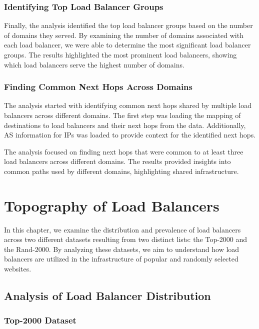 \documentclass[12pt]{cwru_thesis}
\begin{document}
\subsection{Identifying Top Load Balancer Groups}

Finally, the analysis identified the top load balancer groups based on the number of domains they served. By examining the number of domains associated with each load balancer, we were able to determine the most significant load balancer groups. The results highlighted the most prominent load balancers, showing which load balancers serve the highest number of domains.

\subsection{Finding Common Next Hops Across Domains}

The analysis started with identifying common next hops shared by multiple load balancers across different domains. The first step was loading the mapping of destinations to load balancers and their next hops from the data. Additionally, AS information for IPs was loaded to provide context for the identified next hops. 

The analysis focused on finding next hops that were common to at least three load balancers across different domains. The results provided insights into common paths used by different domains, highlighting shared infrastructure.

\chapter{Topography of Load Balancers}

In this chapter, we examine the distribution and prevalence of load balancers across two different datasets resulting from two distinct lists: the Top-2000 and the Rand-2000. By analyzing these datasets, we aim to understand how load balancers are utilized in the infrastructure of popular and randomly selected websites.

\section{Analysis of Load Balancer Distribution}

\subsection{Top-2000 Dataset}
\end{document}
